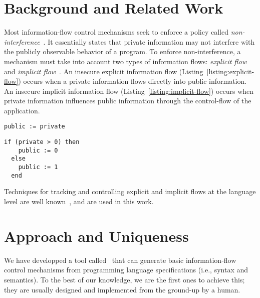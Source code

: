 \documentclass[sigplan,10pt]{acmart}\settopmatter{printfolios=true,printccs=false,printacmref=false}
\begin{document}
\section{Background and Related Work}
Most information-flow control mechanisms seek to enforce a policy called \emph{non-interference}~\cite{DBLP:conf/sp/GoguenM82a}. It essentially states that private information may not interfere with the publicly observable behavior of a program. To enforce non-interference, a mechanism must take into account two types of information flows: \emph{explicit flow} and \emph{implicit flow}~\cite{DBLP:journals/cacm/Denning76}. An insecure explicit information flow (Listing~\ref{listing:explicit-flow}) occurs when a private information flows directly into public information. An insecure implicit information flow (Listing~\ref{listing:implicit-flow}) occurs when private information influences public information through the control-flow of the application.

\begin{lstlisting}[captionpos=b, caption=Insecure explicit flow, label=listing:explicit-flow]
  public := private
\end{lstlisting}

\begin{lstlisting}[captionpos=b, caption=Insecure implicit flow, label=listing:implicit-flow]
  if (private > 0) then
    public := 0
  else
    public := 1
  end
\end{lstlisting}

Techniques for tracking and controlling explicit and implicit flows at the language level are well known~\cite{DBLP:journals/jcs/VolpanoIS96, DBLP:conf/csfw/RussoS10}, and are used in this work. 


\section{Approach and Uniqueness}
We have developped a tool called \ottifc\ that can generate basic information-flow control mechanisms from programming language specifications (i.e., syntax and semantics). To the best of our knowledge, we are the first ones to achieve this; they are usually designed and implemented from the ground-up by a human.
\end{document}
